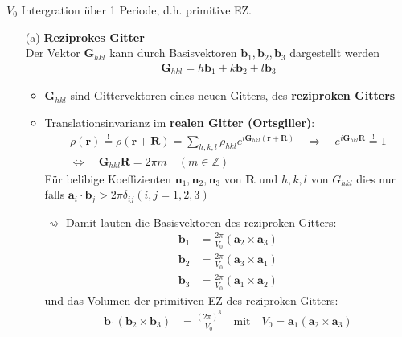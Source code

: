 $V_0$ Intergration über 1 Periode, d.h. primitive EZ.
\begin{itemize}
    \item[(a)] \textbf{Reziprokes Gitter}\\
          Der Vektor $\textbf{G}_{hkl}$ kann durch Basisvektoren $\textbf{b}_1, \textbf{b}_2, \textbf{b}_3$ dargestellt werden
          \begin{align*}
              \textbf{G}_{hkl} = h \textbf{b}_1 + k \textbf{b}_2 + l \textbf{b}_3
          \end{align*}
          \begin{itemize}
              \item $\textbf{G}_{hkl}$ sind Gittervektoren eines neuen Gitters, des \textbf{reziproken Gitters}
              \item Translationsinvarianz im \textbf{realen Gitter (Ortsgiller)}:
                    \begin{align*}
                        \rho(\textbf{r})  \overset{!}{=}  \rho(\textbf{r} + \textbf{R}) = \sum_{h,k,l} \rho_{hkl} e^{i \textbf{G}_{hkl} (\textbf{r}+\textbf{R})} \quad \Rightarrow \quad e^{i \textbf{G}_{hkl} \textbf{R}} \overset{!}{=} 1 \\
                        \Leftrightarrow \quad \textbf{G}_{hkl} \textbf{R} = 2 \pi m \quad (m \in \mathbb{Z})
                    \end{align*}
                    Für belibige Koeffizienten $ \textbf{n}_1, \textbf{n}_2, \textbf{n}_3$ von $\textbf{R}$ und $h,k,l$ von $G_{hkl}$ dies nur  falls $\textbf{a}_i\cdot \textbf{b}_j > 2\pi \delta_{ij} (i,j = 1,2,3)$
                \item[$\rightsquigarrow$] Damit lauten die Basisvektoren des reziproken Gitters:
                \begin{align*}
                    \textbf{b}_1 &= \frac{2 \pi}{V_0} ( \textbf{a}_2 \times \textbf{a}_3)\\
                    \textbf{b}_2 &= \frac{2 \pi}{V_0} ( \textbf{a}_3 \times \textbf{a}_1)\\
                    \textbf{b}_3 &= \frac{2 \pi}{V_0} ( \textbf{a}_1 \times \textbf{a}_2)
                \end{align*}
                und das Volumen der primitiven EZ des reziproken Gitters:
                \begin{align*}
                    \textbf{b}_1 ( \textbf{b}_2 \times \textbf{b}_3) &= \frac{(2 \pi)^3}{V_0} \quad \text{mit} \quad V_0 = \textbf{a}_1 ( \textbf{a}_2 \times \textbf{a}_3)

\end{align*}
\end{itemize}
\end{itemize}
